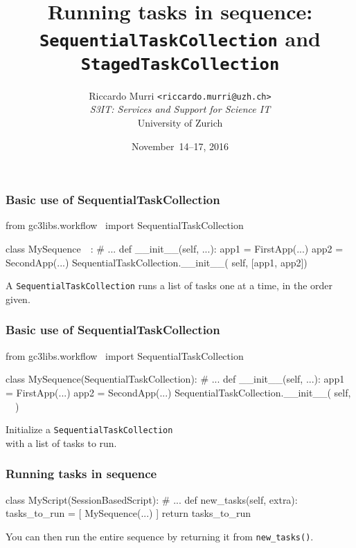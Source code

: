 \documentclass[english,serif,mathserif,xcolor=pdftex,dvipsnames,table]{beamer}
\title[Sequencing tasks]{%
  Running tasks in sequence: \\
  \texttt{SequentialTaskCollection} and \texttt{StagedTaskCollection}
}
\author[R. Murri, S3IT UZH]{%
  Riccardo Murri \texttt{<riccardo.murri@uzh.ch>}
  \\[1ex]
  \emph{S3IT: Services and Support for Science IT}
  \\[1ex]
  University of Zurich
}
\date{November~14--17, 2016}
\begin{document}
\maketitle


\begin{frame}[fragile]
  \frametitle{Basic use of SequentialTaskCollection}

\begin{python}
from gc3libs.workflow \
  import SequentialTaskCollection

class MySequence~~:
  # ...
  def __init__(self, ...):
    app1 = FirstApp(...)
    app2 = SecondApp(...)
    SequentialTaskCollection.__init__(
      self, [app1, app2])
\end{python}

  \+
  A \texttt{SequentialTaskCollection} runs a list of tasks one at a time, in the order given.
\end{frame}


\begin{frame}[fragile]
  \frametitle{Basic use of SequentialTaskCollection}

\begin{python}
from gc3libs.workflow \
  import SequentialTaskCollection

class MySequence(SequentialTaskCollection):
  # ...
  def __init__(self, ...):
    app1 = FirstApp(...)
    app2 = SecondApp(...)
    SequentialTaskCollection.__init__(
      self, ~~)
\end{python}

  \+
  Initialize a \texttt{SequentialTaskCollection} \\
  with a list of tasks to run.
\end{frame}


\begin{frame}[fragile]
  \frametitle{Running tasks in sequence}

\begin{python}
class MyScript(SessionBasedScript):
  # ...
  def new_tasks(self, extra):
    tasks_to_run = [
      MySequence(...)
    ]
    return tasks_to_run
\end{python}

  \+ You can then run the entire sequence by returning it from
  \lstinline|new_tasks()|.
\end{frame}
\end{document}
